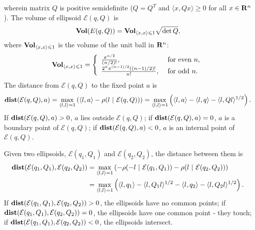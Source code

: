 \documentclass[letterpaper,10pt,english]{sphinxmanual}
\begin{document}
wherein matrix $Q$ is positive semidefinite ($Q=Q^T$ and
$\langle x, Qx\rangle\geqslant0$ for all $x\in{\bf R}^n$).
The volume of ellipsoid ${\mathcal E}(q,Q)$ is
\label{main_source:equation-ellvolume}\begin{gather}
\begin{split}{\bf Vol}(E(q,Q)) = {\bf Vol}_{\langle x,x\rangle\leqslant1}\sqrt{\det Q},\end{split}\label{main_source-ellvolume}
\end{gather}
where ${\bf Vol}_{\langle x,x\rangle\leqslant1}$ is the volume of
the unit ball in ${\bf R}^n$:
\label{main_source:equation-ellunitball}\begin{gather}
\begin{split}{\bf Vol}_{\langle x,x\rangle\leqslant1} = \left\{\begin{array}{ll}
\frac{\pi^{n/2}}{(n/2)!}, &
\mbox{ for even } n,\\
\frac{2^n\pi^{(n-1)/2}\left((n-1)/2\right)!}{n!}, &
\mbox{ for odd } n. \end{array}\right.\end{split}\label{main_source-ellunitball}
\end{gather}
The distance from ${\mathcal E}(q,Q)$ to the fixed point $a$
is
\label{main_source:equation-dist_point}\begin{gather}
\begin{split}{\bf dist}({\mathcal E}(q,Q),a) = \max_{\langle l,l\rangle=1}\left(\langle l,a\rangle -
\rho(l ~|~ {\mathcal E}(q,Q)) \right) =
\max_{\langle l,l\rangle=1}\left(\langle l,a\rangle - \langle l,q\rangle -
\langle l,Ql\rangle^{1/2}\right).\end{split}\label{main_source-dist_point}
\end{gather}
If ${\bf dist}({\mathcal E}(q,Q),a) > 0$, $a$ lies outside
${\mathcal E}(q,Q)$; if
${\bf dist}({\mathcal E}(q,Q),a) = 0$, $a$ is a boundary
point of ${\mathcal E}(q,Q)$; if
${\bf dist}({\mathcal E}(q,Q),a) < 0$, $a$ is an internal
point of ${\mathcal E}(q,Q)$.

Given two ellipsoids, ${\mathcal E}(q_1,Q_1)$ and
${\mathcal E}(q_2,Q_2)$, the distance between them is
\label{main_source:equation-dist_ell}\begin{gather}
\begin{split}\begin{aligned}
{\bf dist}({\mathcal E}(q_1,Q_1),{\mathcal E}(q_2,Q_2)) & = \max_{\langle l,l\rangle=1}
\left(-\rho(-l ~|~ {\mathcal E}(q_1,Q_1)) - \rho(l ~|~ {\mathcal E}(q_2,Q_2))\right) \\
& = \max_{\langle l,l\rangle=1}\left(\langle l,q_1\rangle -
\langle l,Q_1l\rangle^{1/2} - \langle l,q_2\rangle -
\langle l,Q_2l\rangle^{1/2}\right).
\end{aligned}\end{split}\label{main_source-dist_ell}
\end{gather}
If ${\bf dist}({\mathcal E}(q_1,Q_1),{\mathcal E}(q_2,Q_2)) > 0$,
the ellipsoids have no common points; if
${\bf dist}({\mathcal E}(q_1,Q_1),{\mathcal E}(q_2,Q_2)) = 0$, the
ellipsoids have one common point - they touch; if
${\bf dist}({\mathcal E}(q_1,Q_1),{\mathcal E}(q_2,Q_2)) < 0$, the
ellipsoids intersect.
\end{document}
